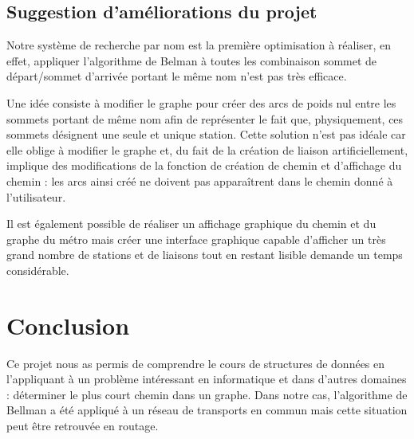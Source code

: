 \documentclass{report}
\begin{document}
\section{Suggestion d'améliorations du projet}
Notre système de recherche par nom est la première optimisation à réaliser, en effet, appliquer l'algorithme de Belman à toutes les combinaison sommet de départ/sommet d'arrivée portant le même nom n'est pas très efficace.
	
Une idée consiste à modifier le graphe pour créer des arcs de poids nul entre les sommets portant de même nom afin de représenter le fait que, physiquement, ces sommets désignent une seule et unique station. Cette solution n'est pas idéale car elle oblige à modifier le graphe et, du fait de la création de liaison artificiellement, implique des modifications de la fonction de création de chemin et d'affichage du chemin : les arcs ainsi créé ne doivent pas apparaîtrent dans le chemin donné à l'utilisateur.

\bigskip
Il est également possible de réaliser un affichage graphique du chemin et du graphe du métro mais créer une interface graphique capable d'afficher un très grand nombre de stations et de liaisons tout en restant lisible demande un temps considérable.
\chapter{Conclusion}

	Ce projet nous as permis de comprendre le cours de structures de données en l'appliquant à un problème intéressant en informatique et dans d'autres domaines : déterminer le plus court chemin dans un graphe. Dans notre cas, l'algorithme de Bellman a été appliqué à un réseau de transports en commun mais cette situation peut être retrouvée en routage.
\end{document}
